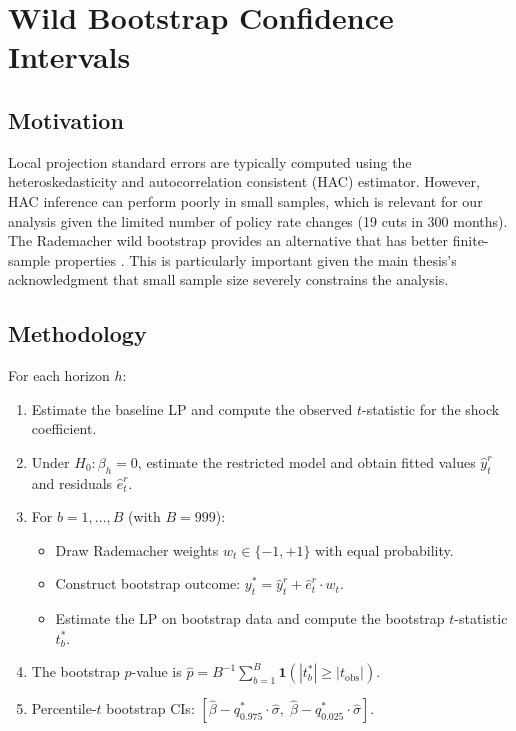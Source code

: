 \documentclass[12pt,a4paper]{article}
\begin{document}
\section{Wild Bootstrap Confidence Intervals}\label{sec:bootstrap}

\subsection{Motivation}

Local projection standard errors are typically computed using the \citet{newey1987} heteroskedasticity and autocorrelation consistent (HAC) estimator. However, HAC inference can perform poorly in small samples, which is relevant for our analysis given the limited number of policy rate changes (19 cuts in 300 months). The Rademacher wild bootstrap provides an alternative that has better finite-sample properties \citep{gonccalves2004}. This is particularly important given the main thesis's acknowledgment that small sample size severely constrains the analysis.

\subsection{Methodology}

For each horizon $h$:
\begin{enumerate}
	\item Estimate the baseline LP and compute the observed $t$-statistic for the shock coefficient.
	\item Under $H_0: \beta_h = 0$, estimate the restricted model and obtain fitted values $\hat{y}_t^r$ and residuals $\hat{e}_t^r$.
	\item For $b = 1, \ldots, B$ (with $B = 999$):
	\begin{itemize}
		\item Draw Rademacher weights $w_t \in \{-1, +1\}$ with equal probability.
		\item Construct bootstrap outcome: $y_t^{*} = \hat{y}_t^r + \hat{e}_t^r \cdot w_t$.
		\item Estimate the LP on bootstrap data and compute the bootstrap $t$-statistic $t_b^*$.
	\end{itemize}
	\item The bootstrap $p$-value is $\hat{p} = B^{-1} \sum_{b=1}^{B} \mathbf{1}(|t_b^*| \geq |t_{\text{obs}}|)$.
	\item Percentile-$t$ bootstrap CIs: $[\hat{\beta} - q_{0.975}^* \cdot \hat{\sigma}, \; \hat{\beta} - q_{0.025}^* \cdot \hat{\sigma}]$.
\end{enumerate}
\end{document}
